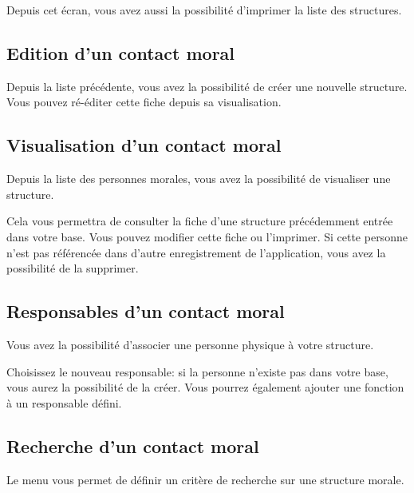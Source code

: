 \documentclass[letterpaper,10pt,french]{sphinxmanual}
\begin{document}
Depuis cet écran, vous avez aussi la possibilité d’imprimer la liste des structures.

\noindent{}


\subsection{Edition d’un contact moral}
\label{\detokenize{contacts/legal_entity:edition-d-un-contact-moral}}
Depuis la liste précédente, vous avez la possibilité de créer une nouvelle structure. Vous pouvez ré-éditer cette fiche depuis sa visualisation.

\noindent{}


\subsection{Visualisation d’un contact moral}
\label{\detokenize{contacts/legal_entity:visualisation-d-un-contact-moral}}
Depuis la liste des personnes morales, vous avez la possibilité de visualiser une structure.

Cela vous permettra de consulter la fiche d’une structure précédemment entrée dans votre base. Vous pouvez modifier cette fiche ou l’imprimer. Si cette personne n’est pas référencée dans d’autre enregistrement de l’application, vous avez la possibilité de la supprimer.

\noindent{}


\subsection{Responsables d’un contact moral}
\label{\detokenize{contacts/legal_entity:responsables-d-un-contact-moral}}
Vous avez la possibilité d’associer une personne physique à votre structure.

Choisissez le nouveau responsable: si la personne n’existe pas dans votre base, vous aurez la possibilité de la créer. Vous pourrez également ajouter une fonction à un responsable défini.

\noindent{}


\subsection{Recherche d’un contact moral}
\label{\detokenize{contacts/legal_entity:recherche-d-un-contact-moral}}
Le menu  vous permet de définir un critère de recherche sur une structure morale.
\end{document}
